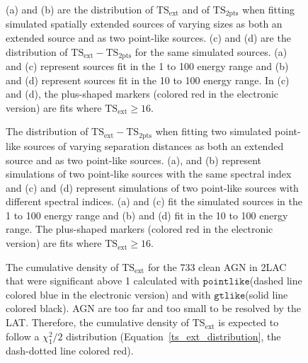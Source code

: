 \documentclass[12pt,preprint]{aastex}
\newif\ifcolorfigure
\newcommand{\gev}{\text{GeV}\xspace}
\newcommand{\tsext}{{\ensuremath{\text{TS}_{\text{ext}}}}\xspace}
\newcommand{\tsinc}{\ensuremath{\text{TS}_{\text{2pts}}}\xspace}
\newcommand{\gtlike}{\ensuremath{\mathtt{gtlike}}\xspace}
\newcommand{\pointlike}{\ensuremath{\mathtt{pointlike}}\xspace}
\begin{document}
\clearpage
\begin{figure}
    \ifcolorfigure
    \plotone{mc_plots/confusion_extended_plot_color.eps}
    \else
    \fi
    \caption{
    (a) and (b) are the distribution of \tsext and of \tsinc when
    fitting simulated spatially extended sources of varying sizes as
    both an extended source and as two point-like sources.  (c) and
    (d) are the distribution of $\tsext-\tsinc$ for the same simulated sources.
    (a) and (c) represent sources fit in the 1 \gev to 100 \gev energy
    range and (b) and (d) represent sources fit in the 10 \gev to
    100 \gev energy range.  In (c) and (d), the plus-shaped markers
    (colored red in the electronic version) are fits where $\tsext\ge16$.
    }\label{confusion_extended_plot}
  \end{figure}


\clearpage
\begin{figure}
    \ifcolorfigure
    \plotone{mc_plots/confusion_2pts_plot_color.eps}
    \else
    \fi
    \caption{
    The distribution of $\tsext-\tsinc$ when fitting two simulated
    point-like sources of varying separation distances as
    both an extended source and as two point-like sources.  (a),
    and (b) represent simulations of two point-like sources with the
    same spectral index and (c) and (d) represent simulations of two
    point-like sources with different spectral indices.  (a) and (c)
    fit the simulated sources in the 1 \gev to 100 \gev energy range
    and (b) and (d) fit in the 10 \gev to 100 \gev energy range.
    The plus-shaped markers (colored red in the electronic version)
    are fits where $\tsext\ge16$.
    }\label{confusion_2pts_plot}
  \end{figure}


\clearpage
\begin{figure}
    \ifcolorfigure
      \plotone{source_plots/agn_color.eps}
    \else
    \fi
    \caption{The cumulative density of \tsext for the 733 clean
    AGN in 2LAC that were significant above 1 \gev calculated with \pointlike (dashed line
    colored blue in the electronic version)
    and with \gtlike (solid line colored black).  AGN are too far
    and too small to be resolved by the LAT. Therefore, the cumulative
    density of $\tsext$ is expected to follow a $\chi^2_1/2$ distribution
    (Equation~\ref{ts_ext_distribution}, the dash-dotted line colored
    red).
    }\label{agn_ts_ext}
  \end{figure}
\end{document}

